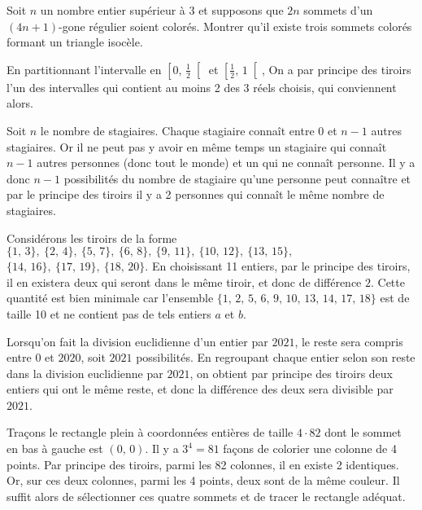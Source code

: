 \begin{exo}
Soit $n$ un nombre entier supérieur à 3 et supposons que $2n$ sommets d'un $(4n + 1)$-gone régulier soient colorés. Montrer qu'il existe trois sommets colorés formant un triangle isocèle.
\end{exo}

\bigskip



\begin{sol}
En partitionnant l'intervalle en $\left[0, \, \frac12\right[$ et $\left[\frac12, \, 1\right[$, On a par principe des tiroirs l'un des intervalles qui contient au moins 2 des 3 réels choisis, qui conviennent alors.
\end{sol}


\begin{sol}
Soit $n$ le nombre de stagiaires. Chaque stagiaire connaît entre $0$ et $n - 1$ autres stagiaires. Or il ne peut pas y avoir en même temps un stagiaire qui connaît $n - 1$ autres personnes (donc tout le monde) et un qui ne connaît personne. Il y a donc $n-1$ possibilités du nombre de stagiaire qu'une personne peut connaître et par le principe des tiroirs il y a 2 personnes qui connaît le même nombre de stagiaires.
\end{sol}


\begin{sol}
Considérons les tiroirs de la forme $\{1, \, 3\}, \ \{2, \, 4\}, \ \{5, \, 7\}, \ \{6, \, 8\}, \ \{9, \, 11\}, \ \{10, \, 12\}, \ \{13, \, 15\},$ $\{14, \, 16\}, \ \{17, \, 19\}, \ \{18, \, 20\}$. En choisissant 11 entiers, par le principe des tiroirs, il en existera deux qui seront dans le même tiroir, et donc de différence $2$. Cette quantité est bien minimale car l'ensemble $\{1, \, 2, \, 5, \, 6, \, 9, \, 10, \, 13, \, 14, \, 17, \, 18\}$ est de taille 10 et ne contient pas de tels entiers $a$ et $b$.
\end{sol}


\begin{sol}
Lorsqu'on fait la division euclidienne d'un entier par $2021$, le reste sera compris entre $0$ et $2020$, soit $2021$ possibilités. En regroupant chaque entier selon son reste dans la division euclidienne par $2021$, on obtient par principe des tiroirs deux entiers qui ont le même reste, et donc la différence des deux sera divisible par $2021$.
\end{sol}


\begin{sol}
Traçons le rectangle plein à coordonnées entières de taille $4 \cdot 82$ dont le sommet en bas à gauche est $(0, \, 0)$. Il y a $3^4 = 81$ façons de colorier une colonne de 4 points. Par principe des tiroirs, parmi les 82 colonnes, il en existe 2 identiques. Or, sur ces deux colonnes, parmi les 4 points, deux sont de la même couleur. Il suffit alors de sélectionner ces quatre sommets et de tracer le rectangle adéquat.
\end{sol}


